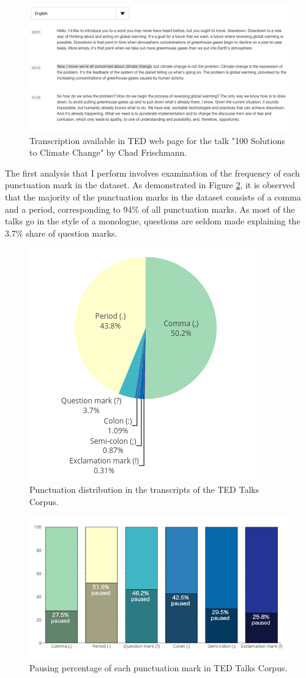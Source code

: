 \begin{figure}[h]
\centering\includegraphics[width=0.9\linewidth]{img/ted_transcript_structure.png}
\caption{Transcription available in TED web page for the talk "100 Solutions to Climate Change" by Chad Frischmann.}
\label{punkProse:figure:ted_transcripts}
\end{figure}

The first analysis that I perform involves examination of the frequency of each punctuation mark in the dataset. As demonstrated in Figure \ref{punkProse:figure:punc-freq-pause-perc:a}, it is observed that the majority of the punctuation marks in the dataset consists of a comma and a period, corresponding to 94\% of all punctuation marks. As most of the talks go in the style of a monologue, questions are seldom made explaining the 3.7\% share of question marks. 

\begin{figure}[h]
\centering\includegraphics[width=0.6\linewidth]{img/1-ted-punc-freq.png}
\caption{Punctuation distribution in the transcripts of the TED Talks Corpus.}
\label{punkProse:figure:punc-freq-pause-perc:a}
\end{figure}

\begin{figure}[h]
\centering\includegraphics[width=0.6\linewidth]{img/2-pause-ratio.png}
\caption{Pausing percentage of each punctuation mark in TED Talks Corpus.}
\label{punkProse:figure:punc-freq-pause-perc:b}
\end{figure}

